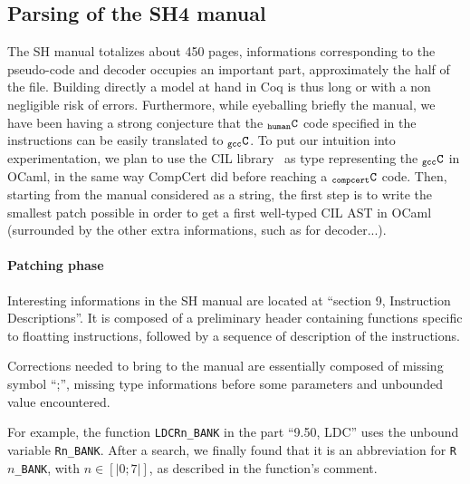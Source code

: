 \documentclass[a4paper, 11pt]{article}
\newcommand{\C}{$_{\tt compcert}{\tt C}$\xspace}
\newcommand{\gccC}{$_{\tt gcc}{\tt C}$\xspace}
\newcommand{\hC}{$_{\tt human}{\tt C}$\xspace}
\begin{document}
  \subsection{Parsing of the SH4 manual}
The SH manual totalizes about 450 pages, informations corresponding to the pseudo-code and decoder occupies an important part, approximately the half of the file. Building directly a model at hand in Coq is thus long or with a non negligible risk of errors. 
Furthermore, while eyeballing briefly the manual, we have been having a strong conjecture that the \hC code specified in the instructions can be easily translated to \gccC. To put our intuition into experimentation, we plan to use the CIL library~\cite{necula} as type representing the \gccC in OCaml, in the same way CompCert did before reaching a \C code. Then, starting from the manual considered as a string, the first step is to write the smallest patch possible in order to get a first well-typed CIL AST in OCaml (surrounded by the other extra informations, such as for decoder...).

\paragraph{Patching phase}

Interesting informations in the SH manual are located at ``section 9, Instruction Descriptions''. It is composed of a preliminary header containing functions specific to floatting instructions, followed by a sequence of description of the instructions. 

Corrections needed to bring to the manual are essentially composed of missing symbol ``;'', missing type informations before some parameters and unbounded value encountered. 

For example, the function \verb|LDCRn_BANK| in the part ``9.50, LDC'' uses the unbound variable \verb|Rn_BANK|.  After a search, we finally found that it is an abbreviation for \verb|R|$n$\verb|_BANK|, with $n \in [|0;7|]$, as described in the function's comment. 
\end{document}
